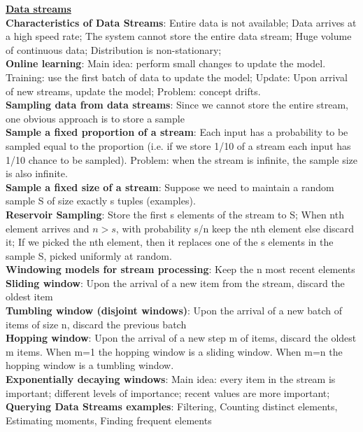 \documentclass[a4paper,7pt,landscape]{extarticle}
\begin{document}
\begin{multicols}{3}
\begin{boxA}
\underline{\textbf{Data streams}}\\
\textbf{Characteristics of Data Streams}: Entire data is not available; Data arrives at a high speed rate; The system cannot store the entire data stream; Huge volume of continuous data; Distribution is non-stationary;\\
\textbf{Online learning}: Main idea: perform small changes to update the model. Training: use the first batch of data to update the model; Update: Upon arrival of new streams, update the model; Problem: concept drifts.\\
\textbf{Sampling data from data streams}: Since we cannot store the entire stream, one obvious approach is to store a sample\\
\textbf{Sample a fixed proportion of a stream}: Each input has a probability to be sampled equal to the proportion (i.e. if we store 1/10 of a stream each input has 1/10 chance to be sampled). Problem: when the stream is infinite, the sample size is also infinite.\\
\textbf{Sample a fixed size of a stream}: Suppose we need to maintain a random sample S of size exactly s tuples (examples).\\
\textbf{Reservoir Sampling}: Store the first s elements of the stream to S; When nth element arrives and $n > s$, with probability s/n keep the nth element else discard it; If we picked the nth element, then it replaces one of the s elements in the sample S, picked uniformly at random.\\
\textbf{Windowing models for stream processing}: Keep the n most recent elements\\
\textbf{Sliding window}: Upon the arrival of a new item from the stream, discard the oldest item\\
\textbf{Tumbling window (disjoint windows)}: Upon the arrival of a new batch of items of size n, discard the previous batch\\
\textbf{Hopping window}: Upon the arrival of a new step  m of items, discard the oldest m items. When m=1 the hopping window is a sliding window. When m=n the hopping window is a tumbling window.\\
\textbf{Exponentially decaying windows}: Main idea: every item in the stream is important; different levels of importance; recent values are more important;\\
\textbf{Querying Data Streams examples}: Filtering, Counting distinct elements, Estimating moments, Finding frequent elements\\

\end{boxA}
\end{multicols}
\end{document}
